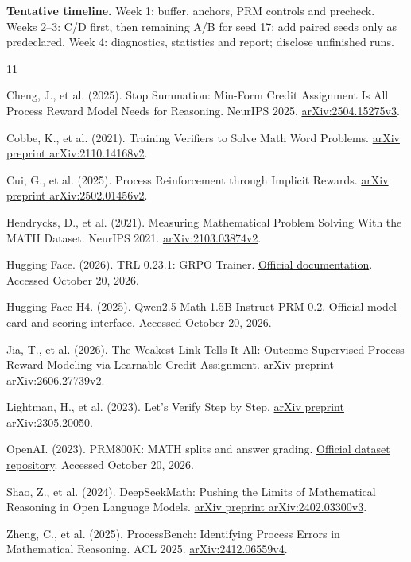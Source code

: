 \documentclass{article}
\begin{document}
\textbf{Tentative timeline.} Week 1: buffer, anchors, PRM controls and precheck. Weeks 2--3: C/D first, then remaining A/B for seed 17; add paired seeds only as predeclared. Week 4: diagnostics, statistics and report; disclose unfinished runs.
\clearpage
\begin{thebibliography}{11}
\raggedright
{}
Cheng, J., et al. (2025).
Stop Summation: Min-Form Credit Assignment Is All Process Reward Model Needs for Reasoning.
NeurIPS 2025.
\href{https://arxiv.org/abs/2504.15275v3}{arXiv:2504.15275v3}.

Cobbe, K., et al. (2021).
Training Verifiers to Solve Math Word Problems.
\href{https://arxiv.org/abs/2110.14168v2}{arXiv preprint arXiv:2110.14168v2}.

Cui, G., et al. (2025).
Process Reinforcement through Implicit Rewards.
\href{https://arxiv.org/abs/2502.01456v2}{arXiv preprint arXiv:2502.01456v2}.

Hendrycks, D., et al. (2021).
Measuring Mathematical Problem Solving With the MATH Dataset.
NeurIPS 2021.
\href{https://arxiv.org/abs/2103.03874v2}{arXiv:2103.03874v2}.

Hugging Face. (2026).
TRL 0.23.1: GRPO Trainer.
\href{https://huggingface.co/docs/trl/v0.23.1/grpo_trainer}{Official documentation}.
Accessed October 20, 2026.

Hugging Face H4. (2025).
Qwen2.5-Math-1.5B-Instruct-PRM-0.2.
\href{https://huggingface.co/HuggingFaceH4/Qwen2.5-Math-1.5B-Instruct-PRM-0.2}{Official model card and scoring interface}.
Accessed October 20, 2026.

Jia, T., et al. (2026).
The Weakest Link Tells It All: Outcome-Supervised Process Reward Modeling via Learnable Credit Assignment.
\href{https://arxiv.org/abs/2606.27739v2}{arXiv preprint arXiv:2606.27739v2}.

Lightman, H., et al. (2023).
Let's Verify Step by Step.
\href{https://arxiv.org/abs/2305.20050}{arXiv preprint arXiv:2305.20050}.

OpenAI. (2023).
PRM800K: MATH splits and answer grading.
\href{https://github.com/openai/prm800k}{Official dataset repository}.
Accessed October 20, 2026.

Shao, Z., et al. (2024).
DeepSeekMath: Pushing the Limits of Mathematical Reasoning in Open Language Models.
\href{https://arxiv.org/abs/2402.03300v3}{arXiv preprint arXiv:2402.03300v3}.

Zheng, C., et al. (2025).
ProcessBench: Identifying Process Errors in Mathematical Reasoning.
ACL 2025.
\href{https://arxiv.org/abs/2412.06559v4}{arXiv:2412.06559v4}.
\end{thebibliography}
\end{document}

